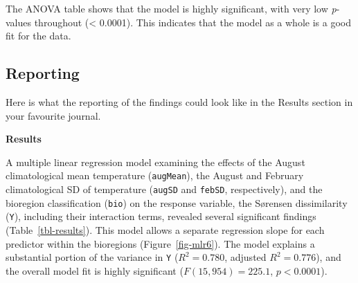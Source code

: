 \documentclass[
  letterpaper,
]{book}
\begin{document}
The ANOVA table shows that the model is highly significant, with very
low \emph{p}-values throughout (\textless{} 0.0001). This indicates that
the model as a whole is a good fit for the data.

\subsection{Reporting}\label{reporting-2}

Here is what the reporting of the findings could look like in the
Results section in your favourite journal.

\textbf{Results}

A multiple linear regression model examining the effects of the August
climatological mean temperature (\texttt{augMean}), the August and
February climatological SD of temperature (\texttt{augSD} and
\texttt{febSD}, respectively), and the bioregion classification
(\texttt{bio}) on the response variable, the Sørensen dissimilarity
(\texttt{Y}), including their interaction terms, revealed several
significant findings (Table~\ref{tbl-results}). This model allows a
separate regression slope for each predictor within the bioregions
(Figure~\ref{fig-mlr6}). The model explains a substantial portion of the
variance in \texttt{Y} (\(R^2 = 0.780\), adjusted \(R^2 = 0.776\)), and
the overall model fit is highly significant (\(F(15, 954) = 225.1\),
\(p < 0.0001\)).
\end{document}
